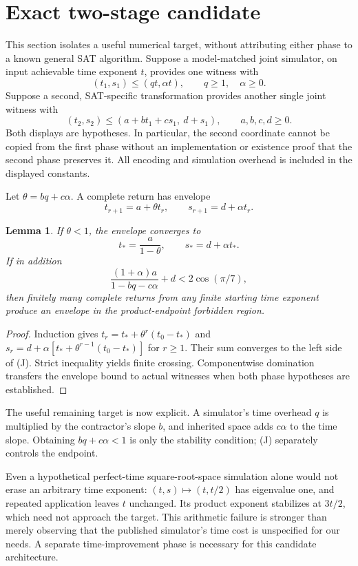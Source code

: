 \documentclass[11pt]{article}
\newtheorem{lemma}{Lemma}
\begin{document}
\section{Exact two-stage candidate}
This section isolates a useful numerical target, without attributing either
phase to a known general SAT algorithm. Suppose a model-matched joint
simulator, on input achievable time exponent $t$, provides one witness with
\[
 (t_1,s_1)\le(qt,\alpha t),\qquad q\ge1,\quad \alpha\ge0.
\]
Suppose a second, SAT-specific transformation provides another single joint
witness with
\[
 (t_2,s_2)\le(a+b t_1+c s_1,\ d+s_1),
 \qquad a,b,c,d\ge0.
\]
Both displays are hypotheses. In particular, the second coordinate cannot
be copied from the first phase without an implementation or existence proof
that the second phase preserves it. All encoding and simulation overhead is
included in the displayed constants.

Let $\theta=bq+c\alpha$. A complete return has envelope
\[
 t_{r+1}=a+\theta t_r,\qquad s_{r+1}=d+\alpha t_r.
\]
\begin{lemma}
If $\theta<1$, the envelope converges to
\[
 t_*=\frac{a}{1-\theta},\qquad s_*=d+\alpha t_*.
\]
If in addition
\[
 \frac{(1+\alpha)a}{1-bq-c\alpha}+d<2\cos(\pi/7),
 \tag{J}
\]
then finitely many complete returns from any finite starting time exponent
produce an envelope in the product-endpoint forbidden region.
\end{lemma}
\begin{proof}
Induction gives $t_r=t_*+\theta^r(t_0-t_*)$ and
$s_r=d+\alpha[t_*+\theta^{r-1}(t_0-t_*)]$ for $r\ge1$.
Their sum converges to the left side of (J). Strict inequality yields finite
crossing. Componentwise domination transfers the envelope bound to actual
witnesses when both phase hypotheses are established.
\end{proof}
The useful remaining target is now explicit. A simulator's time overhead
$q$ is multiplied by the contractor's slope $b$, and inherited space adds
$c\alpha$ to the time slope. Obtaining $bq+c\alpha<1$ is only the stability
condition; (J) separately controls the endpoint.

Even a hypothetical perfect-time square-root-space simulation alone would
not erase an arbitrary time exponent: $(t,s)\mapsto(t,t/2)$ has eigenvalue
one, and repeated application leaves $t$ unchanged. Its product exponent
stabilizes at $3t/2$, which need not approach the target. This arithmetic
failure is stronger than merely observing that the published simulator's
time cost is unspecified for our needs. A separate time-improvement phase
is necessary for this candidate architecture.
\end{document}
